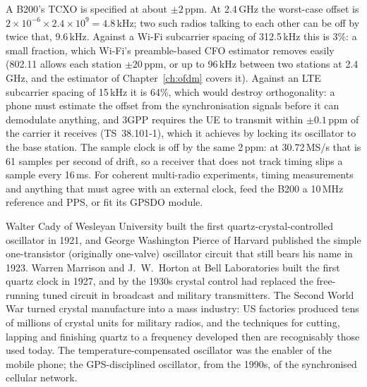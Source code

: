 \begin{worked}
A B200's TCXO is specified at about $\pm2$\,ppm. At 2.4\,GHz the worst-case offset is
$2\times10^{-6}\times2.4\times10^9=4.8$\,kHz; two such radios talking to each other can be off by twice
that, 9.6\,kHz. Against a Wi-Fi subcarrier spacing of 312.5\,kHz this is 3\%: a small fraction, which
Wi-Fi's preamble-based CFO estimator removes easily (802.11 allows each station $\pm20$\,ppm, or up to
96\,kHz between two stations at 2.4\,GHz, and the estimator of Chapter~\ref{ch:ofdm} covers it). Against
an LTE subcarrier spacing of 15\,kHz it is 64\%, which would destroy orthogonality: a phone must
estimate the offset from the synchronisation signals before it can demodulate anything, and 3GPP
requires the UE to transmit within $\pm0.1$\,ppm of the carrier it receives (TS~38.101-1), which it
achieves by locking its oscillator to the base station. The sample clock is off by the same 2\,ppm: at
30.72\,MS/s that is 61 samples per second of drift, so a receiver that does not track timing slips a
sample every 16\,ms. For coherent multi-radio experiments, timing measurements and anything that must
agree with an external clock, feed the B200 a 10\,MHz reference and PPS, or fit its GPSDO module.
\end{worked}

\begin{history}
Walter Cady of Wesleyan University built the first quartz-crystal-controlled oscillator in 1921, and
George Washington Pierce of Harvard published the simple one-transistor (originally one-valve)
oscillator circuit that still bears his name in 1923. Warren Marrison and J.~W.~Horton at Bell
Laboratories built the first quartz clock in 1927, and by the 1930s crystal control had replaced the
free-running tuned circuit in broadcast and military transmitters. The Second World War turned crystal
manufacture into a mass industry: US factories produced tens of millions of crystal units for military
radios, and the techniques for cutting, lapping and finishing quartz to a frequency developed then are
recognisably those used today. The temperature-compensated oscillator was the enabler of the mobile
phone; the GPS-disciplined oscillator, from the 1990s, of the synchronised cellular network.
\end{history}


